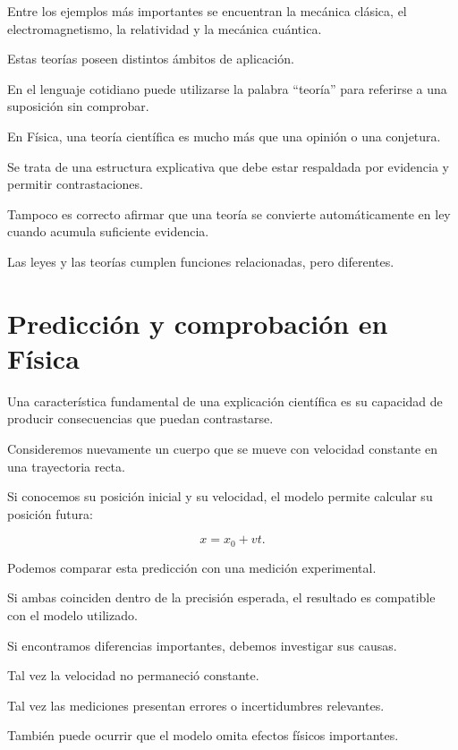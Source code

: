 Entre los ejemplos más importantes
se encuentran la mecánica clásica,
el electromagnetismo, la relatividad
y la mecánica cuántica.

Estas teorías poseen distintos ámbitos
de aplicación.

\begin{errorfrecuente}

En el lenguaje cotidiano puede utilizarse
la palabra ``teoría'' para referirse
a una suposición sin comprobar.

En Física, una teoría científica es mucho
más que una opinión o una conjetura.

Se trata de una estructura explicativa
que debe estar respaldada por evidencia
y permitir contrastaciones.

Tampoco es correcto afirmar que una teoría
se convierte automáticamente en ley
cuando acumula suficiente evidencia.

Las leyes y las teorías cumplen funciones
relacionadas, pero diferentes.

\end{errorfrecuente}


\section{Predicción y comprobación en Física}

Una característica fundamental de una explicación
científica es su capacidad de producir
consecuencias que puedan contrastarse.

Consideremos nuevamente un cuerpo que se mueve
con velocidad constante en una trayectoria recta.

Si conocemos su posición inicial y su velocidad,
el modelo permite calcular su posición futura:

\[x=x_0+vt.\]

Podemos comparar esta predicción
con una medición experimental.

Si ambas coinciden dentro de la precisión
esperada, el resultado es compatible
con el modelo utilizado.

Si encontramos diferencias importantes,
debemos investigar sus causas.

Tal vez la velocidad no permaneció constante.

Tal vez las mediciones presentan errores
o incertidumbres relevantes.

También puede ocurrir que el modelo
omita efectos físicos importantes.

